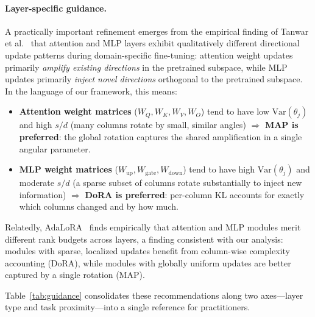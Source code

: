 \documentclass[11pt]{article}
\begin{document}
\paragraph{Layer-specific guidance.}
A practically important refinement emerges from the empirical finding of
Tanwar et al.~\cite{tanwar2025domain} that attention and MLP layers
exhibit qualitatively different directional update patterns during
domain-specific fine-tuning: attention weight updates primarily
\emph{amplify existing directions} in the pretrained subspace, while MLP
updates primarily \emph{inject novel directions} orthogonal to the
pretrained subspace.
In the language of our framework, this means:
\begin{itemize}
  \item \textbf{Attention weight matrices} ($W_Q, W_K, W_V, W_O$) tend to
    have low $\mathrm{Var}(\theta_j)$ and high $s/d$ (many columns rotate
    by small, similar angles) $\Rightarrow$ \textbf{MAP is preferred}:
    the global rotation captures the shared amplification in a single
    angular parameter.
  \item \textbf{MLP weight matrices} ($W_{\mathrm{up}},
    W_{\mathrm{gate}}, W_{\mathrm{down}}$) tend to have high
    $\mathrm{Var}(\theta_j)$ and moderate $s/d$ (a sparse subset of
    columns rotate substantially to inject new information)
    $\Rightarrow$ \textbf{DoRA is preferred}: per-column KL accounts
    for exactly which columns changed and by how much.
\end{itemize}

Relatedly, AdaLoRA~\cite{zhang2023adalora} finds empirically that attention
and MLP modules merit different rank budgets across layers, a finding
consistent with our analysis: modules with sparse, localized updates
benefit from column-wise complexity accounting (DoRA), while modules
with globally uniform updates are better captured by a single rotation
(MAP).

\noindent Table~\ref{tab:guidance} consolidates these recommendations
along two axes---layer type and task proximity---into a single reference
for practitioners.
\end{document}

